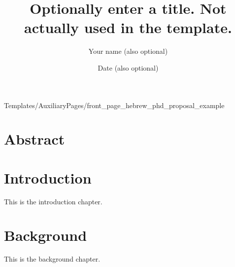 \documentclass[a4paper,12pt]{article}
\title{Optionally enter a title. Not actually used in the template.}
\author{Your name (also optional)}
\date{Date (also optional)}
\begin{document}
   \thispagestyle{empty}
   
            {Templates/AuxiliaryPages/front_page_hebrew_phd_proposal_example}
\clearpage


\section*{Abstract}
\clearpage

    
\clearpage

    \tableofcontents
\clearpage

    \listoffigures
\clearpage



\section{Introduction}
\label{sec_intro}

This is the introduction chapter.

\clearpage

\section{Background}
\label{sec_background}

This is the background chapter.

\clearpage

\end{document}
